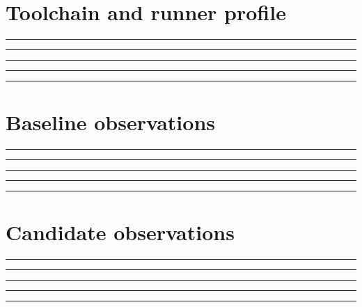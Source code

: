 \documentclass[11pt,letterpaper]{article}
\begin{document}
\section{Toolchain and runner profile}
\vspace{2mm}
\noindent\rule{0.93\linewidth}{0.4pt}\par\vspace{13pt}
\noindent\rule{0.93\linewidth}{0.4pt}\par\vspace{13pt}
\noindent\rule{0.93\linewidth}{0.4pt}\par\vspace{13pt}
\noindent\rule{0.93\linewidth}{0.4pt}\par\vspace{13pt}
\noindent\rule{0.93\linewidth}{0.4pt}\par\vspace{13pt}
\section{Baseline observations}
\vspace{2mm}
\noindent\rule{0.93\linewidth}{0.4pt}\par\vspace{13pt}
\noindent\rule{0.93\linewidth}{0.4pt}\par\vspace{13pt}
\noindent\rule{0.93\linewidth}{0.4pt}\par\vspace{13pt}
\noindent\rule{0.93\linewidth}{0.4pt}\par\vspace{13pt}
\noindent\rule{0.93\linewidth}{0.4pt}\par\vspace{13pt}
\section{Candidate observations}
\vspace{2mm}
\noindent\rule{0.93\linewidth}{0.4pt}\par\vspace{13pt}
\noindent\rule{0.93\linewidth}{0.4pt}\par\vspace{13pt}
\noindent\rule{0.93\linewidth}{0.4pt}\par\vspace{13pt}
\noindent\rule{0.93\linewidth}{0.4pt}\par\vspace{13pt}
\noindent\rule{0.93\linewidth}{0.4pt}\par\vspace{13pt}
\end{document}
